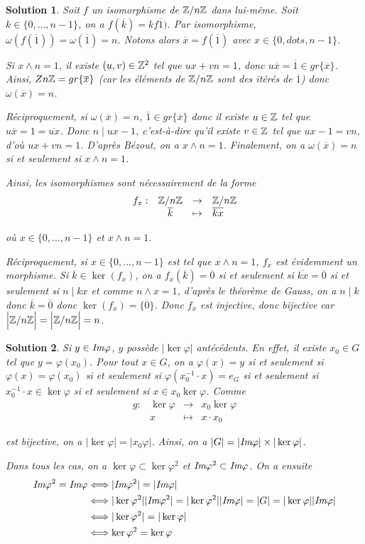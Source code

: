 \documentclass[12pt]{article}
\newtheorem{solution}{Solution}[section]
\theoremstyle{remark}
\newcommand{\function}[5]{
	$$
	\begin{array}{rccl}
		#1: & #2 & \to & #3 \\
		& #4 & \mapsto & #5
	\end{array}
	$$
}
\numberwithin{equation}{section}
\begin{document}
\begin{solution}
	Soit $f$ un isomorphisme de $\mathbb{Z}/n\mathbb{Z}$ dans lui-même. Soit $k\in\{0,\dots,n-1\}$, on a $f(\overline{k})=kf\overline{1})$. Par isomorphisme, $\omega(f(\overline{1}))=\omega(\overline{1})=n$. Notons alors $\overline{x}=f(\overline{1})$ avec $x\in\{0,dots,n-1\}$.

	Si $x\wedge n=1$, il existe $(u,v)\in\mathbb{Z}^{2}$ tel que $ux+vn=1$, donc $u\overline{x}=\overline{1}\in gr\{\overline{x}\}$. Ainsi, $Z\/n\mathbb{Z}=gr\{\overline{x}\}$ (car les éléments de $\mathbb{Z}/n\mathbb{Z}$ sont des itérés de $\overline{1}$) donc $\omega(\overline{x})=n$.

	Réciproquement, si $\omega(\overline{x})=n$, $\overline{1}\in gr\{\overline{x}\}$ donc il existe $u\in\mathbb{Z}$ tel que $u\overline{x}=1=\overline{ux}$. Donc $n\mid ux-1$, c'est-à-dire qu'il existe $v\in\mathbb{Z}$ tel que $ux-1=vn$, d'où $ux+vn=1$. D'après Bézout, on a $x\wedge n=1$. Finalement, on a $\omega(\overline{x})=n$ si et seulement si $x\wedge n=1$.

	Ainsi, les isomorphismes sont nécessairement de la forme \function{f_{x}}{\Z/n\Z}{\Z/n\Z}{\overline{k}}{\overline{kx}}
	où $x\in\{0,\dots,n-1\}$ et $x\wedge n=1$.

	Réciproquement, si $x\in\{0,\dots,n-1\}$ est tel que $x\wedge n=1$, $f_{x}$ est évidemment un morphisme. Si $\overline{k}\in\ker(f_{x})$, on a $f_{x}(\overline{k})=\overline{0}$ si et seulement si $\overline{kx}=\overline{0}$ si et seulement si $n\mid kx$ et comme $n\wedge x=1$, d'après le théorème de Gauss, on a $n\mid k$ donc $\overline{k}=\overline{0}$ donc $\ker(f_{x})=\{\overline{0}\}$. Donc $f_{x}$ est injective, donc bijective car $\Bigl\vert\mathbb{Z}/n\mathbb{Z}\Bigr\vert=\Bigl\vert\mathbb{Z}/n\mathbb{Z}\Bigr\vert=n$.
\end{solution}

\begin{solution}
	Si $y\in \emph{Im}\varphi$, $y$ possède $\vert\ker\varphi\vert$ antécédents. En effet, il existe $x_{0}\in G$ tel que $y=\varphi(x_{0})$. Pour tout $x\in G$, on a $\varphi(x)=y$ si et seulement si $\varphi(x)=\varphi(x_{0})$ si et seulement si $\varphi(x_{0}^{-1}\cdot x)=e_{G}$ si et seulement si $x_{0}^{-1}\cdot x\in\ker\varphi$ si et seulement si $x\in x_{0}\ker\varphi$. Comme \function{g}{\ker\varphi}{x_{0}\ker\varphi}{x}{x\cdot x_{0}}
	est bijective, on a $\vert\ker\varphi\vert=\vert x_{0}\varphi\vert$. Ainsi, on a $\vert G\vert=\vert\emph{Im}\varphi\vert\times\vert\ker\varphi\vert$.

	Dans tous les cas, on a $\ker\varphi\subset\ker\varphi^{2}$ et $\emph{Im}\varphi^{2}\subset\emph{Im}\varphi$. On a ensuite 
	\begin{align*}
		\emph{Im}\varphi^{2}=\emph{Im}\varphi
		&\Longleftrightarrow \vert\emph{Im}\varphi^{2}\vert=\vert\emph{Im}\varphi\vert\\
		&\Longleftrightarrow \vert\ker\varphi^{2}\vert\vert\emph{Im}\varphi^{2}\vert=\vert\ker\varphi^{2}\vert\vert\emph{Im}\varphi\vert=\vert G\vert=\vert\ker\varphi\vert\vert\emph{Im}\varphi\vert\\
		&\Longleftrightarrow \vert\ker\varphi^{2}\vert=\vert\ker\varphi\vert\\
		&\Longleftrightarrow \ker\varphi^{2}=\ker\varphi
	\end{align*}
\end{solution}
\end{document}
